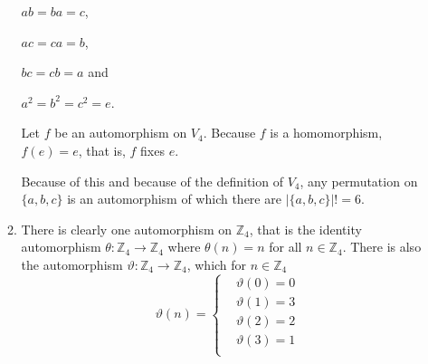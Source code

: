\documentclass[10pt]{article}
\begin{document}
\begin{enumerate}
\begin{enumerate}
          $ab = ba = c$,

          $ac = ca = b$,

          $bc = cb = a$ and

          $a^2 = b^2 = c^2 = e$.

          Let $f$ be an automorphism on $V_4$. Because $f$ is a homomorphism,
          $f(e) = e$, that is, $f$ fixes $e$.

          Because of this and because of the definition of $V_4$, any
          permutation on $\{a,b,c\}$ is an automorphism of which there are
          $\Big|\{a,b,c\}\Big|! = 6$.
        \item There is clearly one automorphism on $\mathbb{Z}_4$, that is the
          identity automorphism $\theta : \mathbb{Z}_4 \rightarrow
          \mathbb{Z}_4$ where $\theta(n) = n$ for all $n \in \mathbb{Z}_4$.
          There is also the automorphism $\vartheta : \mathbb{Z}_4
          \rightarrow\mathbb{Z}_4$, which for $n \in \mathbb{Z}_4$
          $$
          \vartheta(n) =
            \begin{cases}
              &\vartheta(0) = 0 \\
              &\vartheta(1) = 3 \\
              &\vartheta(2) = 2 \\
              &\vartheta(3) = 1 \\
            \end{cases}
          $$
      \end{enumerate}

  \end{enumerate}
\end{document}

